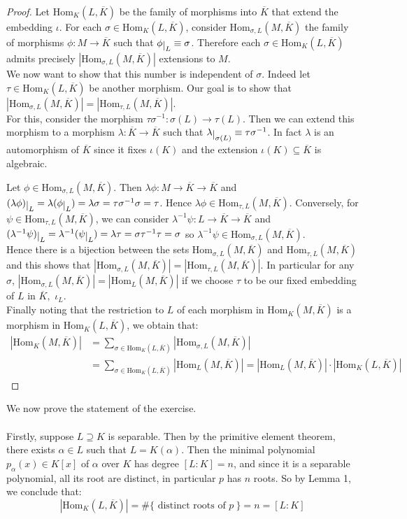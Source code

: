 \documentclass[12pt,a4paper]{article}
\newcommand{\Hom}[2]{\text{Hom}_{#1}({#2},\overline{K})}
\newcommand\restrict[1]{\raisebox{-.5ex}{$|$}_{#1}}
\begin{document}
\begin{proof}Let $\Hom{K}{L}$ be the family of morphisms into $\overline{K}$ that extend the embedding $\iota$. For each $\sigma \in \Hom{K}{L}$, consider $\Hom{\sigma,L}{M}$ the family of morphisms $\phi: M\rightarrow \overline{K}$ such that $\phi\restrict{L}\equiv \sigma$. Therefore each $\sigma \in \Hom{K}{L}$ admits precisely $|\Hom{\sigma,L}{M}|$ extensions to $M$.\\

We now want to show that this number is independent of $\sigma$. Indeed let $\tau \in \Hom{K}{L}$ be another morphism. Our goal is to show that \\ $|\Hom{\sigma,L}{M}|=|\Hom{\tau,L}{M}|$.\\

For this, consider the morphism $\tau\sigma^{-1}:\sigma(L)\rightarrow\tau(L)$. Then we can extend this morphism to a morphism $\lambda: \overline{K}\rightarrow\overline{K}$ such that $\lambda\restrict{\sigma(L)}\equiv \tau\sigma^{-1}$. In fact $\lambda$ is an automorphism of $\overline{K}$ since it fixes $\iota(K)$ and the extension $\iota(K)\subseteq \overline{K}$ is algebraic.

Let $\phi\in \Hom{\sigma,L}{M}$. Then $\lambda\phi: M\rightarrow \overline{K} \rightarrow \overline{K}$ and $(\lambda\phi)\restrict{L}=\lambda(\phi\restrict{L})=\lambda\sigma = \tau\sigma^{-1}\sigma=\tau$. Hence $\lambda\phi\in \Hom{\tau,L}{M}$.
Conversely, for $\psi\in \Hom{\tau,L}{M}$, we can consider $\lambda^{-1}\psi:L \rightarrow \overline{K} \rightarrow \overline{K}$ and
 $(\lambda^{-1}\psi)\restrict{L}=\lambda^{-1}(\psi\restrict{L})=\lambda\tau = \sigma\tau^{-1}\tau=\sigma $ so $\lambda^{-1}\psi\in \Hom{\sigma,L}{M}$. \\
 Hence there is a bijection between the sets $\Hom{\sigma,L}{M}$ and $\Hom{\tau,L}{M}$ and this shows that $|\Hom{\sigma,L}{M}|=|\Hom{\tau,L}{M}|$.  In particular for any $\sigma$, $|\Hom{\sigma,L}{M}|=|\Hom{L}{M}|$ if we choose $\tau$ to be our fixed embedding of $L$ in $\overline{K},$ $\iota_L$. \\

Finally noting that the restriction to $L$ of each morphism in $\Hom{K}{M}$ is a morphism in $\Hom{K}{L}$,  we obtain that: 
\begin{align*}
|\Hom{K}{M}|&=\sum_{\sigma\in \Hom{K}{L}}|\Hom{\sigma,L}{M}|\\
&=\sum_{\sigma\in \Hom{K}{L}}|\Hom{L}{M}|=|\Hom{L}{M}|\cdot |\Hom{K}{L}|
\end{align*}
\end{proof}
We now prove the statement of the exercise. \\
\\
Firstly, suppose $L\supseteq K$ is separable. Then by the primitive element theorem, there exists $\alpha \in L$ such that $L=K(\alpha)$. Then the minimal polynomial $p_\alpha(x)\in K[x]$ of $\alpha$ over $K$ has degree $[L:K]=n$, and since it is a separable polynomial, all its root are distinct, in particular $p$ has $n$ roots. So by Lemma 1, we conclude that: 
$$ |\Hom{K}{L}| = \#\{\text{ distinct roots of } p\ \} = n = [L:K]$$
\end{document}
